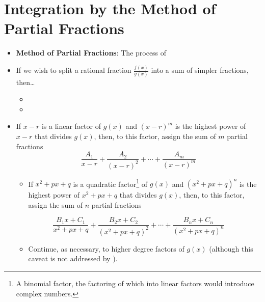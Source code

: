 \documentclass[../main.tex]{subfiles}
\begin{document}
\section{Integration by the Method of Partial Fractions}
\begin{itemize}
    \item {}\textbf{Method of Partial Fractions}: The process of 
    \item If we wish to split a rational fraction $\frac{f(x)}{g(x)}$ into a sum of simpler fractions, then\dots
    \begin{itemize}
        \item {}
        \item {}
    \end{itemize}
    \item If $x-r$ is a linear factor of $g(x)$ and $(x-r)^m$ is the highest power of $x-r$ that divides $g(x)$, then, to this factor, assign the sum of $m$ partial fractions
    \begin{equation*}
        \frac{A_1}{x-r}+\frac{A_2}{(x-r)^2}+\cdots+\frac{A_m}{(x-r)^m}
    \end{equation*}
    \begin{itemize}
        \item If $x^2+px+q$ is a quadratic factor\footnote{A binomial factor, the factoring of which into linear factors would introduce complex numbers.} of $g(x)$ and $\left( x^2+px+q \right)^n$ is the highest power of $x^2+px+q$ that divides $g(x)$, then, to this factor, assign the sum of $n$ partial fractions
    \end{itemize}
    \begin{equation*}
        \frac{B_1x+C_1}{x^2+px+q}+\frac{B_2x+C_2}{\left( x^2+px+q \right)^2}+\cdots+\frac{B_nx+C_n}{\left( x^2+px+q \right)^n}
    \end{equation*}
    \begin{itemize}
        \item Continue, as necessary, to higher degree factors of $g(x)$ (although this caveat is not addressed by \cite{bib:Thomas}).

\end{itemize}
\end{itemize}
\end{document}
